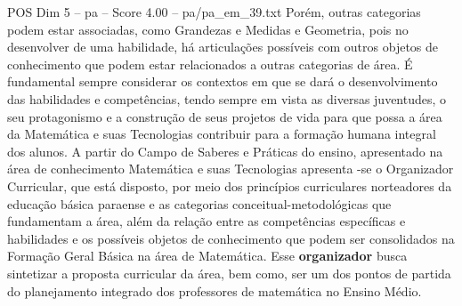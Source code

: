 \begin{textsample}{POS Dim 5 – pa – Score 4.00 – pa/pa\_em\_39.txt}
Porém, outras categorias podem estar associadas, como Grandezas e Medidas e Geometria, pois no desenvolver de uma habilidade, há articulações possíveis com outros objetos de conhecimento que podem estar relacionados a outras categorias de área.
É fundamental sempre considerar os contextos em que se dará o desenvolvimento das habilidades e competências, tendo sempre em vista as diversas juventudes, o seu protagonismo e a construção de seus projetos de vida para que possa a área da Matemática e suas Tecnologias contribuir para a formação humana integral dos alunos.
A partir do Campo de Saberes e Práticas do ensino, apresentado na área de conhecimento Matemática e suas Tecnologias apresenta -se o Organizador Curricular, que está disposto, por meio dos princípios curriculares norteadores da educação básica paraense e as categorias conceitual-metodológicas que fundamentam a área, além da relação entre as competências específicas e habilidades e os possíveis objetos de conhecimento que podem ser consolidados na Formação Geral Básica na área de Matemática.
Esse \textbf{organizador} busca sintetizar a proposta curricular da área, bem como, ser um dos pontos de partida do planejamento integrado dos professores de matemática no Ensino Médio.

\end{textsample}
